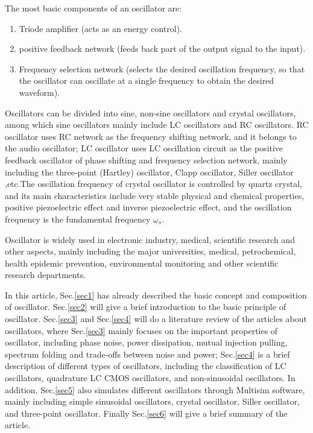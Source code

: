 \documentclass[conference]{IEEEtran}
\begin{document}
The most basic components of an oscillator are:
\begin{enumerate}
    \item Triode amplifier (acts as an energy control).
    \item positive feedback network (feeds back part of the output signal to the input).
    \item Frequency selection network (selects the desired oscillation frequency, so that the oscillator can oscillate at a single frequency to obtain the desired waveform).
\end{enumerate}


Oscillators can be divided into sine, non-sine oscillators and crystal oscillators, among which sine oscillators mainly include LC oscillators and RC oscillators. RC oscillator uses RC network as the frequency shifting network, and it belongs to the audio oscillator; LC oscillator uses LC oscillation circuit as the positive feedback oscillator of phase shifting and frequency selection network, mainly including the three-point (Hartley) oscillator, Clapp oscillator, Siller oscillator ,etc.The oscillation frequency of crystal oscillator is controlled by quartz crystal, and its main characteristics include very stable physical and chemical properties, positive piezoelectric effect and inverse piezoelectric effect, and the oscillation frequency is the fundamental frequency $\omega_s$.

Oscillator is widely used in electronic industry, medical, scientific research and other aspects, mainly including the major universities, medical, petrochemical, health epidemic prevention, environmental monitoring and other scientific research departments.

In this article, Sec.\ref{sec1} has already described the basic concept and composition of oscillator. Sec.\ref{sec2} will give a brief introduction to the basic principle of oscillator. Sec.\ref{sec3} and Sec.\ref{sec4} will do a literature review of the articles about oscillators, where Sec.\ref{sec3} mainly focuses on the important properties of oscillator, including phase noise, power dissipation, mutual injection pulling, spectrum folding and trade-offs between noise and power; Sec.\ref{sec4} is a brief description of different types of oscillators, including the classification of LC oscillators, quadrature LC CMOS oscillators, and non-sinusoidal oscillators. In addition, Sec.\ref{sec5} also simulates different oscillators through Multisim software, mainly including simple sinusoidal oscillators, crystal oscillator, Siller oscillator, and three-point oscillator. Finally Sec.\ref{sec6} will give a brief summary of the article.
\end{document}
